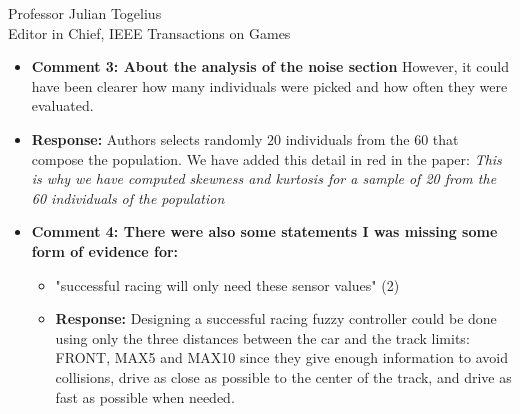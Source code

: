 \documentclass[10pt]{letter} %
\begin{document}
\begin{letter}{Professor Julian Togelius \\ Editor in Chief, IEEE Transactions on Games}
\begin{enumerate}
\begin{itemize}
		Thus, we have carried out new experiments considering two training tracks: the previously used `Alpine 2' track and a newly introduced called `Wheel 2' track, which is a Suzuka F1 inspired track with more challenging difficulties, hairpin turns and long straight segments. It is longer than Alpine 2 (See Figure 3 in the paper).\\
		Furthermore, another track has been added for testing the controller, named `Street 1' track. This controller has many long speed segments, difficult sharp turns. In addition, the track is two meters larger than the others  three considered tracks which increase the overtaking possibilities.\\
		These changes imply updating all the Tables and Figures of the Experiments and Results section. All the modifications have been marked in red color in the text.\\
		
		 
		\item {\bf   Comment 3:	About the analysis of the noise section} However, it could have been clearer how many individuals were picked and how often they were evaluated.
		\item {\bf Response:}
		Authors selects randomly $20$ individuals from the $60$ that compose the population.
		We have  added this detail in red in the paper:
		{\em This is why we have computed skewness and kurtosis for a sample of 20 from the 60 individuals of the population}\\	

		\item {\bf   Comment 4: There were also some statements I was missing some form of evidence for:}
			\begin{itemize}
			\item	"successful racing will only need these sensor values" (2)
					\item {\bf Response:} 
					Designing a successful racing fuzzy controller   could be done using only the three distances  between the car and the track limits: FRONT, MAX5 and MAX10	since they give enough information to avoid collisions, drive as close as possible to the
					center of the track, and drive as fast as possible when needed.\\
					

\end{itemize}
\end{itemize}
\end{enumerate}
\end{letter}
\end{document}
